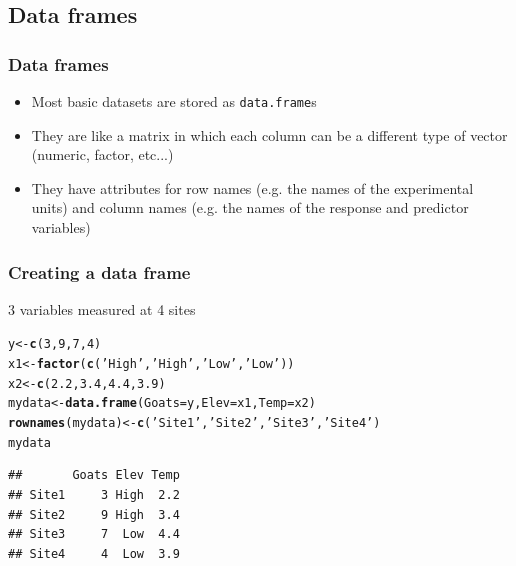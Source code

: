 \documentclass[color=usenames,dvipsnames]{beamer}\usepackage[]{graphicx}\usepackage[]{color}
\makeatletter
\newcommand{\hlnum}[1]{\textcolor[rgb]{0.686,0.059,0.569}{#1}}%
\newcommand{\hlstr}[1]{\textcolor[rgb]{0.192,0.494,0.8}{#1}}%
\newcommand{\hlstd}[1]{\textcolor[rgb]{0.345,0.345,0.345}{#1}}%
\newcommand{\hlkwb}[1]{\textcolor[rgb]{0.69,0.353,0.396}{#1}}%
\newcommand{\hlkwc}[1]{\textcolor[rgb]{0.333,0.667,0.333}{#1}}%
\newcommand{\hlkwd}[1]{\textcolor[rgb]{0.737,0.353,0.396}{\textbf{#1}}}%
\newenvironment{kframe}{%
 \def\at@end@of@kframe{}%
 \ifinner\ifhmode%
  \def\at@end@of@kframe{\end{minipage}}%
  \begin{minipage}{\columnwidth}%
 \fi\fi%
 \def\FrameCommand##1{\hskip\@totalleftmargin \hskip-\fboxsep
 \colorbox{shadecolor}{##1}\hskip-\fboxsep
     \hskip-\linewidth \hskip-\@totalleftmargin \hskip\columnwidth}%
 \MakeFramed {\advance\hsize-\width
   \@totalleftmargin\z@ \linewidth\hsize
   \@setminipage}}%
 {\par\unskip\endMakeFramed%
 \at@end@of@kframe}
\newenvironment{knitrout}{}{} %
\makeatother
\begin{document}
\subsection{Data frames}


\begin{frame}[fragile]
  \frametitle{Data frames}
  \Large
  \begin{itemize}[<+->]
    \item Most basic datasets are stored as \verb+data.frame+s
    \item They are like a matrix in which each column can be a
      different type of vector (numeric, factor, etc...)
    \item They have attributes for row names (e.g. the names of
      the experimental units) and column names (e.g. the names of
      the response and predictor variables)
  \end{itemize}
\end{frame}



\begin{frame}[fragile]
  \frametitle{Creating a data frame}
  {\LARGE 3 variables measured at 4 sites}
\begin{knitrout}
\color{fgcolor}\begin{kframe}
\begin{alltt}
\hlstd{y} \hlkwb{<-} \hlkwd{c}\hlstd{(}\hlnum{3}\hlstd{,} \hlnum{9}\hlstd{,} \hlnum{7}\hlstd{,} \hlnum{4}\hlstd{)}
\hlstd{x1} \hlkwb{<-} \hlkwd{factor}\hlstd{(}\hlkwd{c}\hlstd{(}\hlstr{'High'}\hlstd{,} \hlstr{'High'}\hlstd{,} \hlstr{'Low'}\hlstd{,} \hlstr{'Low'}\hlstd{))}
\hlstd{x2} \hlkwb{<-} \hlkwd{c}\hlstd{(}\hlnum{2.2}\hlstd{,} \hlnum{3.4}\hlstd{,} \hlnum{4.4}\hlstd{,} \hlnum{3.9}\hlstd{)}
\hlstd{mydata} \hlkwb{<-} \hlkwd{data.frame}\hlstd{(}\hlkwc{Goats}\hlstd{=y,} \hlkwc{Elev}\hlstd{=x1,} \hlkwc{Temp}\hlstd{=x2)}
\hlkwd{rownames}\hlstd{(mydata)} \hlkwb{<-} \hlkwd{c}\hlstd{(}\hlstr{'Site1'}\hlstd{,} \hlstr{'Site2'}\hlstd{,} \hlstr{'Site3'}\hlstd{,} \hlstr{'Site4'}\hlstd{)}
\hlstd{mydata}
\end{alltt}
\begin{verbatim}
##       Goats Elev Temp
## Site1     3 High  2.2
## Site2     9 High  3.4
## Site3     7  Low  4.4
## Site4     4  Low  3.9
\end{verbatim}
\end{kframe}
\end{knitrout}

\end{frame}
\end{document}
